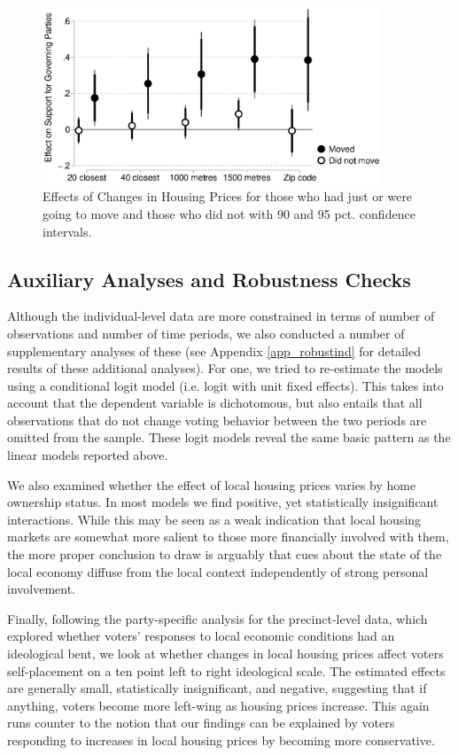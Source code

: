 \documentclass[12pt,a4paper]{article}
\begin{document}
	
	
	\begin{figure}[htbp!]
		\includegraphics[width=0.9\textwidth]{../figures/moving.eps}
		\centering
		\caption{Effects of Changes in Housing Prices for those who had just or were going to move and those who did not with 90 and 95 pct. confidence intervals.}\label{move}
	\end{figure}
	
	
	\subsection{Auxiliary Analyses and Robustness Checks}
	
	Although the individual-level data are more constrained in terms of number of observations and number of time periods, we also conducted a number of supplementary analyses of these (see Appendix \ref{app_robustind} for detailed results of these additional analyses). For one, we tried to re-estimate the models using a conditional logit model (i.e. logit with unit fixed effects). This takes into account that the dependent variable is dichotomous, but also entails that all observations that do not change voting behavior between the two periods are omitted from the sample. These logit models reveal the same basic pattern as the linear models reported above. 
	
	We also examined whether the effect of local housing prices varies by home ownership status. In most models we find positive, yet statistically insignificant interactions. While this may be seen as a weak indication that local housing markets are somewhat more salient to those more financially involved with them, the more proper conclusion to draw is arguably that cues about the state of the local economy diffuse from the local context independently of strong personal involvement. 
	
	Finally, following the party-specific analysis for the precinct-level data, which explored whether voters’ responses to local economic conditions had an ideological bent, we look at whether changes in local housing prices affect voters self-placement on a ten point left to right ideological scale. The estimated effects are generally small, statistically insignificant, and negative, suggesting that if anything, voters become more left-wing as housing prices increase. This again runs counter to the notion that our findings can be explained by voters responding to increases in local housing prices by becoming more conservative.
	
\end{document}
